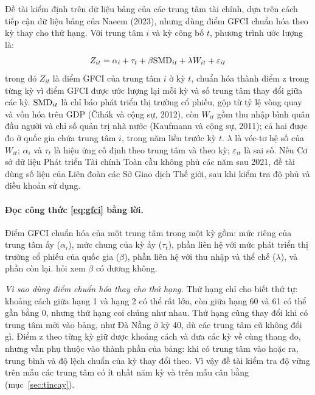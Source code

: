 Đề tài kiểm định  trên dữ liệu bảng của các trung tâm tài chính, dựa trên cách tiếp cận dữ liệu bảng của Naeem (2023), nhưng dùng điểm GFCI chuẩn hóa theo kỳ thay cho thứ hạng. Với trung tâm $i$ và kỳ công bố $t$, phương trình ước lượng là:
\begin{equation}\label{eq:gfci}
Z_{it} = \alpha_i + \tau_t + \beta\mathrm{SMD}_{it} + \lambda W_{it} + \varepsilon_{it}
\end{equation}
trong đó $Z_{it}$ là điểm GFCI của trung tâm $i$ ở kỳ $t$, chuẩn hóa thành điểm z trong từng kỳ vì điểm GFCI được ước lượng lại mỗi kỳ và số trung tâm thay đổi giữa các kỳ. $\mathrm{SMD}_{it}$ là chỉ báo phát triển thị trường cổ phiếu, gộp từ tỷ lệ vòng quay và vốn hóa trên GDP (Čihák và cộng sự, 2012), còn $W_{it}$ gồm thu nhập bình quân đầu người và chỉ số quản trị nhà nước (Kaufmann và cộng sự, 2011); cả hai được đo ở quốc gia chứa trung tâm $i$, trong năm liền trước kỳ $t$. $\lambda$ là véc-tơ hệ số của $W_{it}$; $\alpha_i$ và $\tau_t$ là hiệu ứng cố định theo trung tâm và theo kỳ; $\varepsilon_{it}$ là sai số. Nếu Cơ sở dữ liệu Phát triển Tài chính Toàn cầu không phủ các năm sau 2021, đề tài dùng số liệu của Liên đoàn các Sở Giao dịch Thế giới, sau khi kiểm tra độ phủ và điều khoản sử dụng.

\paragraph{Đọc công thức \eqref{eq:gfci} bằng lời.} Điểm GFCI chuẩn hóa của một trung tâm trong một kỳ gồm: mức riêng của trung tâm ấy ($\alpha_i$), mức chung của kỳ ấy ($\tau_t$), phần liên hệ với mức phát triển thị trường cổ phiếu của quốc gia ($\beta$), phần liên hệ với thu nhập và thể chế ($\lambda$), và phần còn lại.  hỏi xem $\beta$ có dương không.

\begin{vidao}
\emph{Vì sao dùng điểm chuẩn hóa thay cho thứ hạng.} Thứ hạng chỉ cho biết thứ tự: khoảng cách giữa hạng 1 và hạng 2 có thể rất lớn, còn giữa hạng 60 và 61 có thể gần bằng 0, nhưng thứ hạng coi chúng như nhau. Thứ hạng cũng thay đổi khi có trung tâm mới vào bảng, như Đà Nẵng ở kỳ 40, dù các trung tâm cũ không đổi gì. Điểm z theo từng kỳ giữ được khoảng cách và đưa các kỳ về cùng thang đo, nhưng vẫn phụ thuộc vào thành phần của bảng: khi có trung tâm vào hoặc ra, trung bình và độ lệch chuẩn của kỳ thay đổi theo. Vì vậy đề tài kiểm tra độ vững trên mẫu các trung tâm có ít nhất năm kỳ và trên mẫu cân bằng (mục~\ref{sec:tincay}).
\end{vidao}

